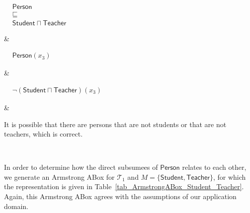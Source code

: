 \documentclass{amsart}
\newcommand\tableExamplarSpacing{3.5cm}
\newcommand\tableCommentSpacing{4cm}
\begin{document}
\begin{table}
\begin{center}
\begin{tabular}
\begin{minipage}{\tableCommentSpacing}
        \end{minipage}       
        \\
        \begin{minipage}{\tableCommentSpacing}
        \vspace{2pt}
            $\begin{aligned}
              &\mathsf{Person}\\
  	      &\sqsubseteq\\
  	      &\mathsf{Student} \sqcap \mathsf{Teacher}
           \end{aligned}$
  	\end{minipage}
        &
        \begin{minipage}{\tableExamplarSpacing}
  	    $\begin{aligned}
               &\mathsf{Person}(x_3)
  	    \end{aligned}$
  	\end{minipage}
  	&
  	\begin{minipage}{\tableExamplarSpacing}
  	    \vspace{2pt}
  	   $\begin{aligned}
             &\neg(\mathsf{Student} \sqcap \mathsf{Teacher})(x_3)
  	    \end{aligned}$ 
  	\end{minipage}
        &
        \begin{minipage}{\tableCommentSpacing}
            \vspace{2pt}
            It is possible that there are persons that are not students or that are not teachers, which is correct.
            \vspace{2pt}
        \end{minipage}       
        \\
        \hline 
        
       \end{tabular}
     \end{center}
     \normalsize
   \end{table}
 
 
  In order to determine how the direct subsumees of $\mathsf{Person}$ relates to each other, we generate an Armstrong ABox for $\mathcal{T}_1$ and $M =\{\mathsf{Student}, \mathsf{Teacher}\}$, for which the representation is given in Table~\ref{tab_ArmstrongABox_Student_Teacher}. Again, this Armstrong ABox agrees with the assumptions of our application domain.
\end{document}
